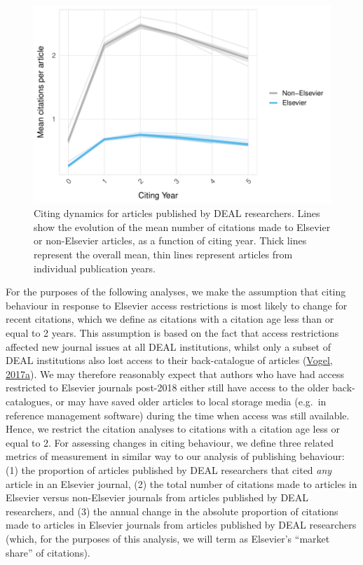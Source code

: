 \documentclass[
]{article}
\begin{document}
\begin{figure}

{\centering \includegraphics[width=0.5\linewidth]{analysis_files/figure-latex/references-publisher-year-cityear-1} 

}

\caption{Citing dynamics for articles published by DEAL researchers. Lines show the evolution of the mean number of citations made to Elsevier or non-Elsevier articles, as a function of citing year. Thick lines represent the overall mean, thin lines represent articles from individual publication years.}\label{fig:references-publisher-year-cityear}
\end{figure}

For the purposes of the following analyses, we make the assumption that citing behaviour in response to Elsevier access restrictions is most likely to change for recent citations, which we define as citations with a citation age less than or equal to 2 years. This assumption is based on the fact that access restrictions affected new journal issues at all DEAL institutions, whilst only a subset of DEAL institutions also lost access to their back-catalogue of articles (\href{https://doi.org/10.1126/science.355.6320.17}{Vogel, 2017a}). We may therefore reasonably expect that authors who have had access restricted to Elsevier journals post-2018 either still have access to the older back-catalogues, or may have saved older articles to local storage media (e.g.~in reference management software) during the time when access was still available. Hence, we restrict the citation analyses to citations with a citation age less or equal to 2. For assessing changes in citing behaviour, we define three related metrics of measurement in similar way to our analysis of publishing behaviour: (1) the proportion of articles published by DEAL researchers that cited \emph{any} article in an Elsevier journal, (2) the total number of citations made to articles in Elsevier versus non-Elsevier journals from articles published by DEAL researchers, and (3) the annual change in the absolute proportion of citations made to articles in Elsevier journals from articles published by DEAL researchers (which, for the purposes of this analysis, we will term as Elsevier's ``market share'' of citations).
\end{document}
